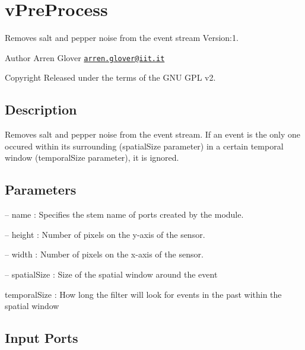 \hypertarget{group__vPreProcess}{}\section{v\+Pre\+Process}
\label{group__vPreProcess}
Removes salt and pepper noise from the event stream Version\+:1. \begin{DoxyAuthor}{Author}
Arren Glover \href{mailto:arren.glover@iit.it}{\tt arren.\+glover@iit.\+it} ~\newline
 
\end{DoxyAuthor}
\begin{DoxyCopyright}{Copyright}
Released under the terms of the G\+NU G\+PL v2. 
\end{DoxyCopyright}
\hypertarget{group__zynqGrabber_intro_sec}{}\subsection{Description}\label{group__zynqGrabber_intro_sec}
Removes salt and pepper noise from the event stream. If an event is the only one occured within its surrounding (spatial\+Size parameter) in a certain temporal window (temporal\+Size parameter), it is ignored.\hypertarget{group__zynqGrabber_parameters_sec}{}\subsection{Parameters}\label{group__zynqGrabber_parameters_sec}

\begin{DoxyItemize}
\item -- name \+: Specifies the stem name of ports created by the module.
\item -- height \+: Number of pixels on the y-\/axis of the sensor.
\item -- width \+: Number of pixels on the x-\/axis of the sensor.
\item -- spatial\+Size \+: Size of the spatial window around the event 

 temporal\+Size \+: How long the filter will look for events in the past within the spatial window 
\end{DoxyItemize}\hypertarget{group__zynqGrabber_inputports_sec}{}\subsection{Input Ports}\label{group__zynqGrabber_inputports_sec}

